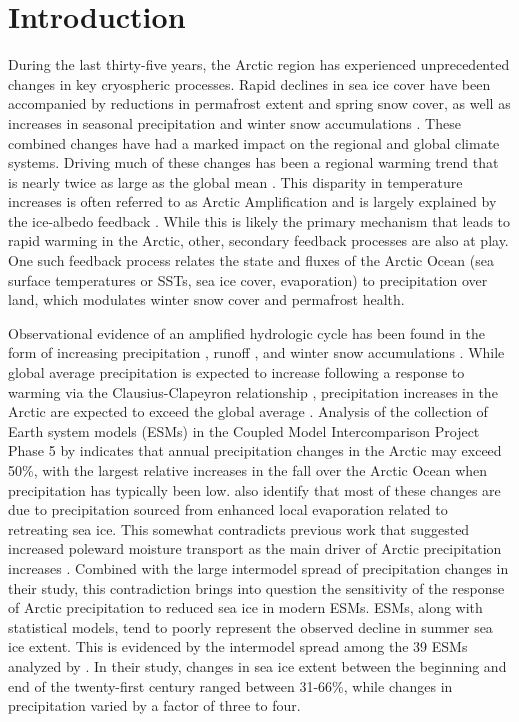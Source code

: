 \section{Introduction}
\label{sec:intro_ch5}

During the last thirty-five years, the Arctic region has experienced unprecedented changes in key cryospheric processes.
Rapid declines in sea ice cover have been accompanied by reductions in permafrost extent and spring snow cover, as well as increases in seasonal precipitation and winter snow accumulations \citep{Kohler_2006,Callaghan_2011,Bulygina_2009,Screen_2012}. %
These combined changes have had a marked impact on the regional and global climate systems.
Driving much of these changes has been a regional warming trend that is nearly twice as large as the global mean \citep{Serreze_2006c,Screen_2010}.
This disparity in temperature increases is often referred to as Arctic Amplification and is largely explained by the ice-albedo feedback \citep{Curry_1995}.
While this is likely the primary mechanism that leads to rapid warming in the Arctic, other, secondary feedback processes are also at play.
One such feedback process relates the state and fluxes of the Arctic Ocean (sea surface temperatures or SSTs, sea ice cover, evaporation) to precipitation over land, which modulates winter snow cover and permafrost health.

Observational evidence of an amplified hydrologic cycle \citep{Stocker_2005} has been found in the form of increasing precipitation \citep{Rawlins_2006}, runoff \citep{Peterson_2002}, and winter snow accumulations \citep{Kohler_2006,Bulygina_2009,Screen_2012}.
While global average precipitation is expected to increase following a response to warming via the Clausius-Clapeyron relationship \citep[e.g.][]{Held_2006,Stephens_2008,Byrne_2015}, precipitation increases in the Arctic are expected to exceed the global average \citep{Stocker_2005}.
Analysis of the collection of Earth system models (ESMs) in the Coupled Model Intercomparison Project Phase 5 \citep[CMIP5; ][]{Taylor_2012} by \citet{Bintanja_2014} indicates that annual precipitation changes in the Arctic may exceed 50\%, with the largest relative increases in the fall over the Arctic Ocean when precipitation has typically been low.
\citet{Bintanja_2014} also identify that most of these changes are due to precipitation sourced from enhanced local evaporation related to retreating sea ice.
This somewhat contradicts previous work that suggested increased poleward moisture transport as the main driver of Arctic precipitation increases \citep{Bengtsson_2011}.
Combined with the large intermodel spread of precipitation changes in their study, this contradiction brings into question the sensitivity of the response of Arctic precipitation to reduced sea ice in modern ESMs.
ESMs, along with statistical models, tend to poorly represent the observed decline in summer sea ice extent.
This is evidenced by the intermodel spread among the 39 ESMs analyzed by \citet{Bintanja_2014}.
In their study, changes in sea ice extent between the beginning and end of the twenty-first century ranged between 31-66\%, while changes in precipitation varied by a factor of three to four.


